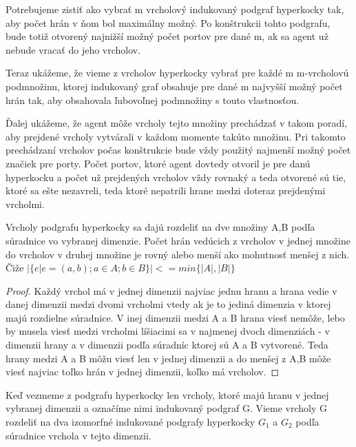 Potrebujeme zistiť ako vybrať m vrcholový indukovaný podgraf hyperkocky tak, 
aby počet hrán v ňom bol maximálny možný. Po konštrukcii tohto podgrafu, bude
totiž otvorený najnižší možný počet portov pre dané m, ak sa agent už nebude
vracať do jeho vrcholov.

Teraz ukážeme, že vieme z vrcholov hyperkocky vybrať pre každé m m-vrcholovú
podmnožinu, ktorej indukovaný graf obsahuje pre dané m najvyšší možný počet
hrán tak, aby obsahovala ľubovoľnej podmnožiny s touto vlastnosťou.

Ďalej ukážeme, že agent môže vrcholy tejto množiny prechádzať v takom
poradí, aby prejdené vrcholy vytvárali v každom momente takúto množinu. Pri
takomto prechádzaní vrcholov počas konštrukcie bude vždy použitý najmenší
možný počet značiek pre porty. Počet portov, ktoré agent dovtedy otvoril je
pre danú hyperkocku a počet už prejdených vrcholov vždy rovnaký a teda
otvorené sú tie, ktoré sa ešte nezavreli, teda ktoré nepatrili hrane medzi
doteraz prejdenými vrcholmi.

\begin{lem}
Vrcholy podgrafu hyperkocky sa dajú rozdeliť na dve množiny A,B podľa súradnice vo
vybranej dimenzie. Počet hrán vedúcich z vrcholov v jednej množine do
vrcholov v druhej množine je rovný alebo menší ako mohutnosť menšej z nich.
Čiže $|\{e|e = (a,b);a \in A; b \in B\}| <= min\{|A|,|B|\}$
\end{lem}
\begin{proof}
Každý vrchol má v jednej dimenzii najviac jednu hranu a hrana vedie v
danej dimenzii medzi dvomi vrcholmi vtedy ak je to jediná dimenzia v ktorej
majú rozdielne súradnice. V inej dimenzii medzi A a B hrana viesť nemôže,
lebo by musela viesť medzi vrcholmi líšiacimi sa v najmenej dvoch 
dimenziách - v dimenzii hrany a v dimenzii podľa súradníc ktorej 
sú A a B vytvorené. Teda hrany medzi A a B môžu viesť len v jednej dimenzii
a do menšej z A,B môže viesť najviac toľko hrán v jednej dimenzii, koľko má
vrcholov.
\end{proof}

\begin{lem}
\label{izomorfne}
Keď vezmeme z podgrafu hyperkocky len vrcholy, ktoré majú hranu v jednej
vybranej dimenzii a označíme nimi indukovaný podgraf G. Vieme vrcholy G
rozdeliť na dva izomorfné indukované podgrafy hyperkocky $G_{1}$ a $G_{2}$
podľa súradnice vrchola v tejto dimenzii.
\end{lem}

